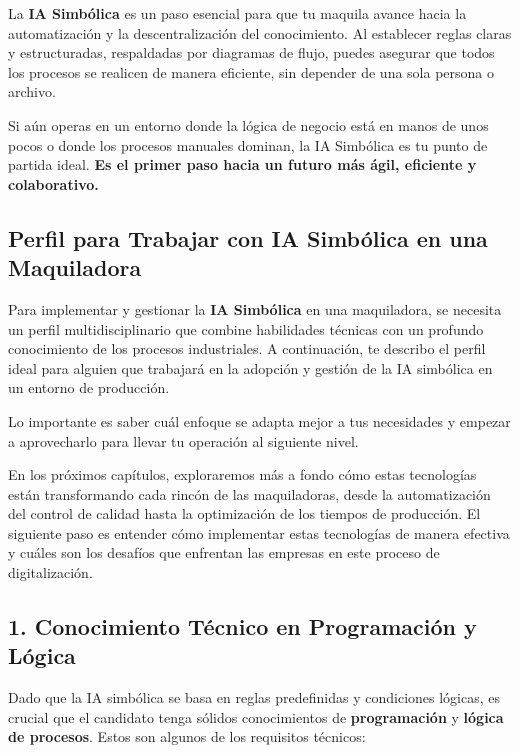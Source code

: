 \documentclass[
  10pt,
  letterpaper,
]{book}
\begin{document}
La \textbf{IA Simbólica} es un paso esencial para que tu maquila avance
hacia la automatización y la descentralización del conocimiento. Al
establecer reglas claras y estructuradas, respaldadas por diagramas de
flujo, puedes asegurar que todos los procesos se realicen de manera
eficiente, sin depender de una sola persona o archivo.

Si aún operas en un entorno donde la lógica de negocio está en manos de
unos pocos o donde los procesos manuales dominan, la IA Simbólica es tu
punto de partida ideal. \textbf{Es el primer paso hacia un futuro más
ágil, eficiente y colaborativo.}

\subsection{Perfil para Trabajar con IA Simbólica en una
Maquiladora}\label{perfil-para-trabajar-con-ia-simbuxf3lica-en-una-maquiladora}

Para implementar y gestionar la \textbf{IA Simbólica} en una
maquiladora, se necesita un perfil multidisciplinario que combine
habilidades técnicas con un profundo conocimiento de los procesos
industriales. A continuación, te describo el perfil ideal para alguien
que trabajará en la adopción y gestión de la IA simbólica en un entorno
de producción.

Lo importante es saber cuál enfoque se adapta mejor a tus necesidades y
empezar a aprovecharlo para llevar tu operación al siguiente nivel.

En los próximos capítulos, exploraremos más a fondo cómo estas
tecnologías están transformando cada rincón de las maquiladoras, desde
la automatización del control de calidad hasta la optimización de los
tiempos de producción. El siguiente paso es entender cómo implementar
estas tecnologías de manera efectiva y cuáles son los desafíos que
enfrentan las empresas en este proceso de digitalización.

\subsection{\texorpdfstring{\textbf{1. Conocimiento Técnico en
Programación y
Lógica}}{1. Conocimiento Técnico en Programación y Lógica}}\label{conocimiento-tuxe9cnico-en-programaciuxf3n-y-luxf3gica}

Dado que la IA simbólica se basa en reglas predefinidas y condiciones
lógicas, es crucial que el candidato tenga sólidos conocimientos de
\textbf{programación} y \textbf{lógica de procesos}. Estos son algunos
de los requisitos técnicos:
\end{document}
